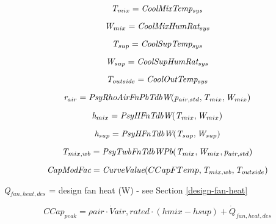 \begin{equation}
\emph{T\(_{mix}\)} = \emph{CoolMixTemp\(_{sys}\)}
\end{equation}

\begin{equation}
\emph{W\(_{mix}\)} = \emph{CoolMixHumRat\(_{sys}\)}
\end{equation}

\begin{equation}
\emph{T\(_{sup}\)} = \emph{CoolSupTemp\(_{sys}\)}
\end{equation}

\begin{equation}
\emph{W\(_{sup}\)} = \emph{CoolSupHumRat\(_{sys}\)}
\end{equation}

\begin{equation}
\emph{T\(_{outside}\)} = \emph{CoolOutTemp\(_{sys}\)}
\end{equation}

\begin{equation}
\emph{r\(_{air}\)} = \emph{PsyRhoAirFnPbTdbW}(\emph{p\(_{air,std}\)}, \emph{T\(_{mix}\)},\emph{W\(_{mix}\)})
\end{equation}

\begin{equation}
\emph{h\(_{mix}\)} = \emph{PsyHFnTdbW}(\emph{T\(_{mix}\)},\emph{W\(_{mix}\)})
\end{equation}

\begin{equation}
\emph{h\(_{sup}\)} = \emph{PsyHFnTdbW}(\emph{T\(_{sup}\)},\emph{W\(_{sup}\)})
\end{equation}

\begin{equation}
\emph{T\(_{mix,wb}\)} = \emph{PsyTwbFnTdbWPb}(\emph{T\(_{mix}\)},\emph{W\(_{mix}\)}, \emph{p\(_{air,std}\)})
\end{equation}

\begin{equation}
\emph{CapModFac} = \emph{CurveValue}(CCapFTemp,\emph{T\(_{mix,wb}\)},\emph{T\(_{outside}\)})
\end{equation}

\emph{Q\(_{fan,heat,des}\)} = design fan heat (W) - see Section \ref{design-fan-heat}

\begin{equation}
CCap_{peak} = \rho air\cdot \dot Vair,rated\cdot (hmix - hsup) + \dot{Q}_{fan,heat,des}
\end{equation}

